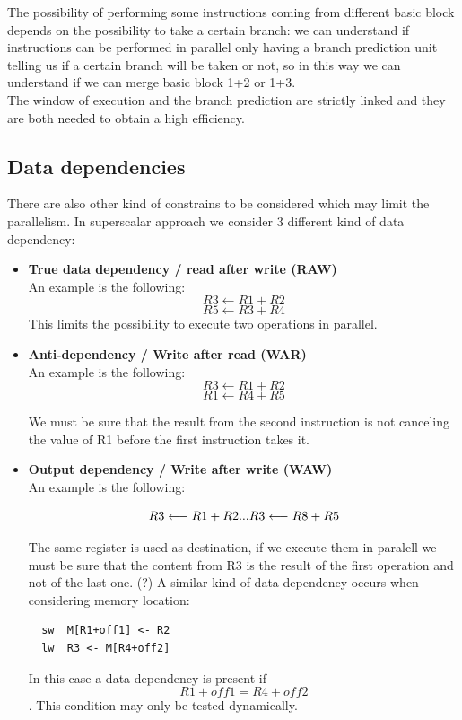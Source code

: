 The possibility of performing some instructions coming from different basic block depends on the possibility to take a certain branch: we can understand if instructions can be performed in parallel only having a branch prediction unit telling us if a certain branch will be taken or not, so in this way we can understand if we can merge basic block 1+2 or 1+3. \\

The window of execution and the branch prediction are strictly linked and they are both needed to obtain a high efficiency.

\subsection{Data dependencies}
There are also other kind of constrains to be considered which may limit the parallelism. In superscalar approach we consider 3 different kind of data dependency:

\begin{itemize}

  \item \textbf{True data dependency / read after write (RAW)}\\
  An example is the following:
  $$R3 \longleftarrow R1+ R2$$
  $$R5 \longleftarrow R3+ R4$$
  This limits the possibility to execute two operations in parallel.

  \item \textbf{Anti-dependency / Write after read (WAR)}\\
  An example is the following:
  $$R3 \longleftarrow R1+ R2$$
  $$R1 \longleftarrow R4+ R5$$

  We must be sure that the result from the second instruction is not canceling the value of R1 before the first instruction takes it.

  \item \textbf{Output dependency / Write after write (WAW)}\\
  An example is the following:

  $$R3 \longleftarrow R1+ R2\\
  ...\\
  R3 \longleftarrow R8+ R5$$

  The same register is used as destination, if we execute them in paralell we must be sure that the content from R3 is the result of the first operation and not of the last one. (?)
  A similar kind of data dependency occurs when considering memory location:
  \begin{verbatim}
  sw  M[R1+off1] <- R2
  lw  R3 <- M[R4+off2]
  \end{verbatim}

  In this case a data dependency is present if $$R1+off1=R4+off2$$. This condition may only be tested dynamically.

\end{itemize}

